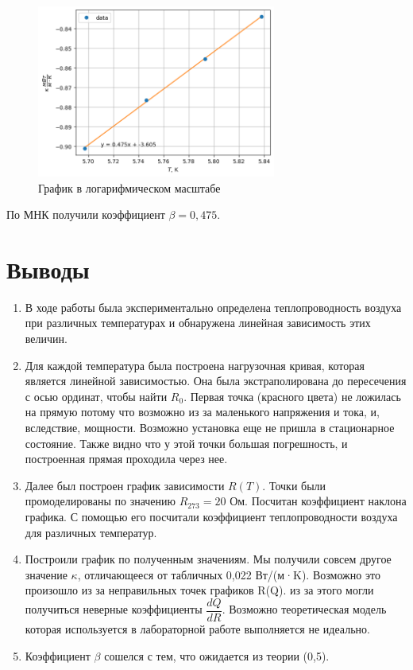\documentclass[a4paper,12pt]{article}
\begin{document}
\begin{figure}[H]
    \centering
    \includegraphics[width=0.7\textwidth]{ln_new.png}
\caption{График в логарифмическом масштабе}
\end{figure}

По МНК получили коэффициент $\beta = 0,475$. 

\section{Выводы}

\begin{enumerate}
    \item В ходе работы была экспериментально определена теплопроводность воздуха при различных температурах и обнаружена линейная зависимость этих величин. 
    \item Для каждой температура была построена нагрузочная кривая, которая является линейной зависимостью. Она была экстраполирована до пересечения с осью ординат, чтобы найти $R_0$. Первая точка (красного цвета) не ложилась на прямую потому что возможно из за маленького напряжения и тока, и, вследствие, мощности. Возможно установка еще не пришла в стационарное состояние. Также видно что у этой точки большая погрешность, и построенная прямая проходила через нее. 
    \item Далее был построен график зависимости $R(T)$. Точки были промоделированы по значению $R_{273} = 20$ Ом. Посчитан коэффициент наклона графика. С помощью его посчитали коэффициент теплопроводности воздуха для различных температур.
    \item Построили график по полученным значениям. Мы получили совсем другое значение $\kappa$, отличающееся от табличных 0,022 Вт/(м·K). Возможно это произошло из за неправильных точек графиков R(Q). из за этого могли получиться неверные коэффициенты $\dfrac{dQ}{dR}$. Возможно теоретическая модель которая используется в лабораторной работе выполняется не идеально. 
    \item Коэффициент $\beta$ сошелся с тем, что ожидается из теории (0,5). 
\end{enumerate}
\end{document}
